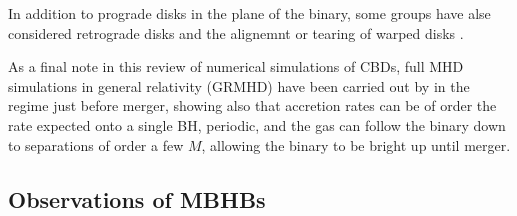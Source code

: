 In addition to prograde disks in the plane of the binary, some groups have alse considered retrograde disks \citep{Nixon+2011, ReodigSesana:2014, BankertShiKrolik:2015, AmaroSeoane:RetroDiscs:2016} and the alignemnt or tearing of warped disks \citep{Nixon+2012, Hayasaki+2013, Nixon+2013, DoganNixonKingPrice:2015}.

As a final note in this review of numerical simulations of CBDs, full MHD
simulations in general relativity (GRMHD) have been carried out by
\cite{Farris:2010, Farris:2011, Farris:2012, Gold:2014a, Gold:2014b} in the
regime just before merger, showing also that accretion rates can be of order
the rate expected onto a single BH, periodic, and the gas can follow the
binary down to separations of order a few $M$, allowing the binary to be
bright up until merger.






\subsection{Observations of MBHBs}

